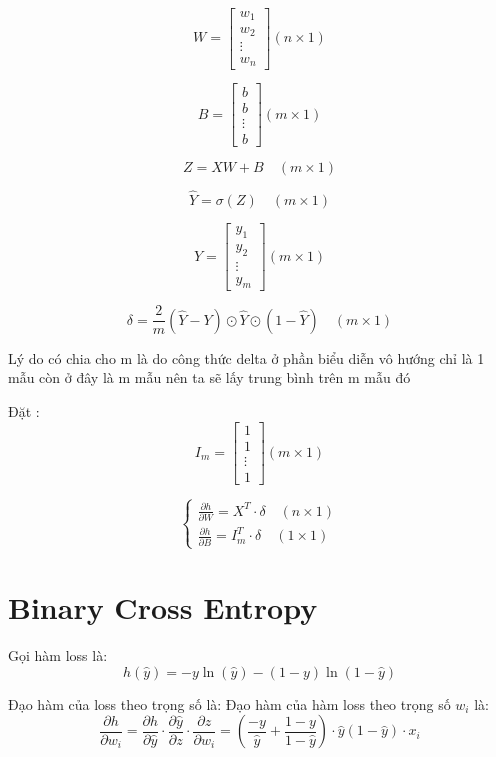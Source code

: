 \documentclass{article}
\begin{document}
\[
    W = \begin{bmatrix}
        w_1 \\ w_2 \\ \vdots \\ w_n
    \end{bmatrix} (n \times 1)
\]

\[
    B = \begin{bmatrix}
        b \\ b \\ \vdots \\ b
    \end{bmatrix} (m \times 1)
\]

\[
    Z = XW + B \quad (m \times 1)
\]

\[
    \hat{Y} = \sigma(Z) \quad (m \times 1)
\]

\[
    Y = \begin{bmatrix}
        y_1 \\ y_2 \\ \vdots \\ y_m
    \end{bmatrix} (m \times 1)
\]

\[
    \delta = \frac{2}{m}(\hat{Y} - Y) \odot \hat{Y} \odot (1-\hat{Y}) \quad (m \times 1)
\]

\noindent Lý do có chia cho m là do công thức delta ở phần biểu diễn vô hướng chỉ là 1 mẫu còn ở đây là m mẫu nên ta sẽ lấy trung bình trên m mẫu đó

\vspace{0.3cm}
\noindent Đặt :
\[
    I_m = \begin{bmatrix}
        1 \\ 1 \\ \vdots \\ 1
    \end{bmatrix} (m \times 1)
\]

\[
    \begin{cases}
        \frac{\partial h}{\partial W} = X^T \cdot \delta \quad (n \times 1) \\
        \frac{\partial h}{\partial B} = I_m^T \cdot \delta \quad (1 \times 1)
    \end{cases}
\]

\section{Binary Cross Entropy}
Gọi hàm loss là: \[h(\hat{y}) = -y\ln(\hat{y}) - (1-y)\ln(1-\hat{y})\] 

Đạo hàm của loss theo trọng số là: 
\noindent Đạo hàm của hàm loss theo trọng số $w_i$ là:
\[
    \frac{\partial h}{\partial w_i} = 
    \frac{\partial h}{\partial \hat{y}} \cdot
    \frac{\partial \hat{y}}{\partial z} \cdot
    \frac{\partial z}{\partial w_i} =
    \left(\frac{-y}{\hat{y}} + \frac{1-y}{1-\hat{y}}\right) \cdot \hat{y}(1 - \hat{y}) \cdot x_i
\]
\end{document}
